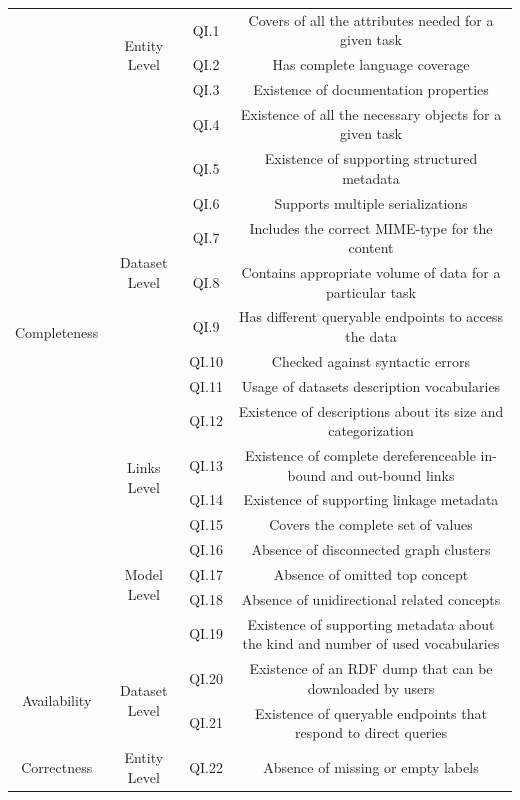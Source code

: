 \documentclass[onecolumn, crcready]{iosart2c}
\begin{document}
\begin{landscape}
\begin{center}
{\begin{longtable}[h]{|c|c|c|c|}
\multirow{19}{*}{Completeness} & \multirow{3}{*}{Entity Level} & QI.1 & Covers of all the attributes needed for a given task \cite{Mendes2012}\tabularnewline
\cline{3-4}
 &  & QI.2 & Has complete language coverage \cite{Mader2012}\tabularnewline
\cline{3-4}
 &  & QI.3 & Existence of documentation properties  \cite{w3c_skos_rec}\cite{Mader2012}\tabularnewline
\cline{2-4}
 & \multirow{9}{*}{Dataset Level} & QI.4 & Existence of all the necessary objects for a given task \cite{Mendes2012}\tabularnewline
\cline{3-4}
 &  & QI.5 & Existence of supporting structured metadata  \cite{Hogan2010}\tabularnewline
\cline{3-4}
 &  & QI.6 & Supports multiple serializations \cite{Framework2012}\tabularnewline
\cline{3-4}
 &  & QI.7 & Includes the correct MIME-type for the content  \cite{Hogan2010}\tabularnewline
\cline{3-4}
 &  & QI.8 & Contains appropriate volume of data for a particular task \cite{Framework2012}\tabularnewline
\cline{3-4}
 &  & QI.9 & Has different queryable endpoints to access the data \cite{Framework2012}\tabularnewline
\cline{3-4}
 &  & QI.10 & Checked against syntactic errors \cite{Hogan2010}\tabularnewline
\cline{3-4}
 &  & QI.11 & Usage of datasets description vocabularies \tabularnewline
\cline{3-4}
 &  & QI.12 & Existence of descriptions about its size and categorization \tabularnewline
\cline{2-4}
 & \multirow{2}{*}{Links Level} & QI.13 & Existence of complete dereferenceable in-bound and out-bound links \cite{Hogan2010}\cite{Mader2012}\cite{Gueret2012}\tabularnewline
\cline{3-4}
 &  & QI.14 & Existence of supporting linkage metadata  \cite{Hogan2010}\tabularnewline
\cline{2-4}
 & \multirow{5}{*}{Model Level} & QI.15 & Covers the complete set of values \cite{Mader2012}\tabularnewline
\cline{3-4}
 &  & QI.16 & Absence of disconnected graph clusters \cite{Mader2012}\tabularnewline
\cline{3-4}
 &  & QI.17 & Absence of omitted top concept \cite{Hogan2010}\tabularnewline
\cline{3-4}
 &  & QI.18 & Absence of unidirectional related concepts \cite{Hogan2010}\tabularnewline
\cline{3-4}
 &  & QI.19 & Existence of supporting metadata about the kind and number of used vocabularies \cite{Framework2012}\tabularnewline
\hline
\hline
\multirow{2}{*}{Availability} & \multirow{2}{*}{Dataset Level} & QI.20 & Existence of an RDF dump that can be downloaded by users \cite{flemming2010}\cite{Hogan2010}\tabularnewline
\cline{3-4}
 &  & QI.21 & Existence of queryable endpoints that respond to direct queries\tabularnewline
\hline
\hline
\multirow{8}{*}{Correctness} & \multirow{4}{*}{Entity Level} & QI.22 & Absence of missing or empty labels \cite{Acosta2013}\cite{Mader2012}\tabularnewline

\end{longtable}}
\end{center}
\end{landscape}
\end{document}

